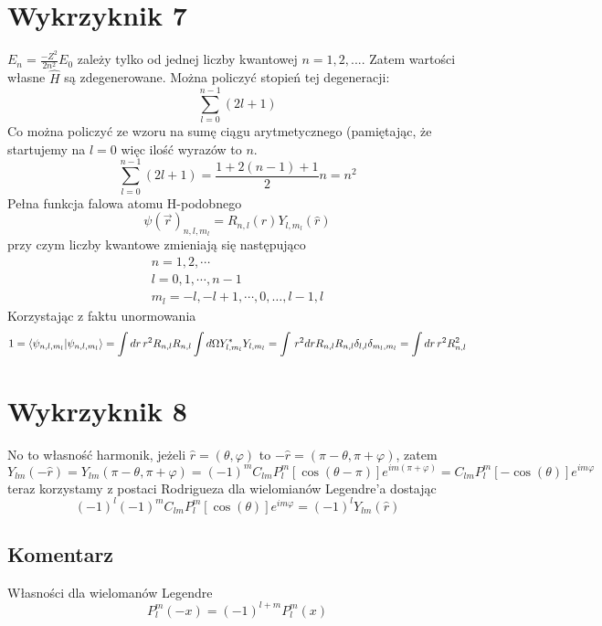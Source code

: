 \documentclass[a4paper,12pt]{article}
\begin{document}
\section{Wykrzyknik 7}
$E_n = \frac{-Z^2}{2n^2}E_0$ zależy tylko od jednej liczby kwantowej $n=1, 2,
...$. Zatem wartości własne $\hat{H}$ są zdegenerowane.
Można policzyć stopień tej degeneracji:
\[
  \sum^{n-1}_{l=0} (2l+1) 
\]
Co można policzyć ze wzoru na sumę ciągu arytmetycznego (pamiętając, że
startujemy na $l=0$ więc ilość wyrazów to $n$.
\[
  \sum^{n-1}_{l=0} (2l+1) = \frac{1+2(n-1) + 1}{2}n = n^2
\]
Pełna funkcja falowa atomu H-podobnego
$$
\psi(\vec{r})_{n,l,m_l} = R_{n,l}(r) Y_{l,m_l}(\hat{r})
$$
przy czym liczby kwantowe zmieniają się następująco
$$
\begin{gathered}
n = 1,2,\cdots\\
l = 0,1,\cdots,n-1\\
m_l = -l,-l+1,\cdots,0,\dots,l-1,l
\end{gathered}
$$
Korzystając z faktu unormowania
$$
\begin{gathered}
1=\bra{\psi_{n,l,m_l}}\ket{\psi_{n,l,m_l}} = \int dr\, r^2 R_{n,l}R_{n,l} \int d\Omega Y^*_{l,m_l}Y_{l,m_l} =  \int\, r^2 dr R_{n,l}R_{n,l} \delta_{l,l}\delta_{m_l,m_l} = \int dr \, r^2 R_{n,l}^2
\end{gathered}
$$
\section{Wykrzyknik 8}
No to własność harmonik, jeżeli $\hat{r} = (\theta,\varphi)$ to $-\hat{r} = (\pi-\theta,\pi+\varphi)$, zatem
$$
	Y_{lm}(-\hat{r}) = Y_{lm}(\pi-\theta,\pi+\varphi) = (-1)^m C_{lm} P^m_l[\cos(\theta-\pi)]e^{im(\pi+\varphi)} = C_{lm} P^m_l[-\cos(\theta)]e^{im\varphi}
$$
teraz korzystamy z postaci Rodrigueza dla wielomianów Legendre'a dostając
$$
	(-1)^l (-1)^m C_{lm} P^m_l[\cos(\theta)]e^{im\varphi} = (-1)^l Y_{lm}(\hat{r})
$$

\subsection{Komentarz}
	Własności dla wielomanów Legendre
	$$
		P_l^m (-x) = (-1)^{l+m} P_l^m(x)
	$$
\end{document}
